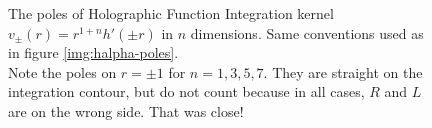 \documentclass[10pt,a4paper, fleqn]{article}
\begin{document}
\begin{figure}
\center
{}
\caption{The poles of Holographic Function Integration kernel $v_\pm(r) = r^{1+n} h'(\pm r)$ in $n$ dimensions. Same conventions used as in figure \ref{img:halpha-poles}.
\\
Note the poles on $r=\pm1$ for $n=1,3,5,7$. They are straight on the integration contour, but do not count because in all cases, $R$ and $L$ are on the wrong side. That was close!
 } \label{img:holo-poles}
\end{figure}
\end{document}
